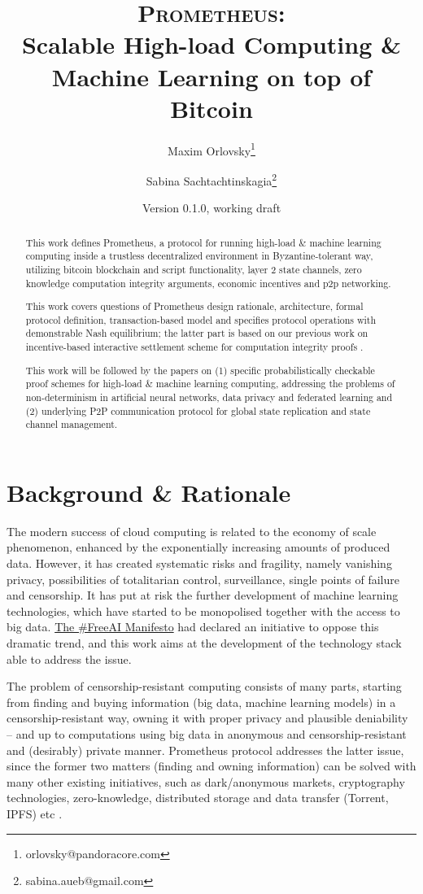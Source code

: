 \documentclass[a4paper]{article}
\title{\textsc{Prometheus}:\\Scalable High-load Computing \& Machine Learning on top of Bitcoin}
\author[1,2]{Maxim Orlovsky\thanks{orlovsky@pandoracore.com}}
\author[1,3]{Sabina Sachtachtinskagia\thanks{sabina.aueb@gmail.com}}
\affil[1]{Pandora Core AG, Switzerland}
\affil[2]{BICA Labs, Switzerland}
\affil[3]{Athens University of Economics and Business, Greece}
\date{Version 0.1.0, working draft}
\begin{document}
\maketitle

\begin{abstract}
This work defines Prometheus, a protocol for running high-load \& machine learning computing inside a trustless decentralized environment in Byzantine-tolerant way, utilizing bitcoin blockchain and script functionality, layer 2 state channels, zero knowledge computation integrity arguments, economic incentives and p2p networking.

This work covers questions of Prometheus design rationale, architecture, formal protocol  definition, transaction-based model and specifies protocol operations with demonstrable Nash equilibrium; the latter part is based on our previous work on incentive-based interactive settlement scheme for computation integrity proofs \cite{ibiss}.

This work will be followed by the papers on (1) specific probabilistically checkable proof schemes for high-load \& machine learning computing, addressing the problems of non-determinism in artificial neural networks, data privacy and federated learning and (2) underlying P2P communication protocol for global state replication and state channel management.
\end{abstract}


\section{Background \& Rationale}

The modern success of cloud computing is related to the economy of scale phenomenon, enhanced by the exponentially increasing amounts of produced data. However, it has created systematic risks and fragility, namely vanishing privacy, possibilities of totalitarian control, surveillance, single points of failure and censorship. It has put at risk the further development of machine learning technologies, which have started to be monopolised together with the access to big data. \href{https://manifesto.ai}{The \#FreeAI Manifesto} \cite{freeai} had declared an initiative to oppose this dramatic trend, and this work aims at the development of the technology stack able to address the issue.

The problem of censorship-resistant computing consists of many parts, starting from  finding and buying information (big data, machine learning models) in a censorship-resistant way, owning it with proper privacy and plausible deniability -- and up to computations using big data in anonymous and censorship-resistant and (desirably) private manner. Prometheus protocol addresses the latter issue, since the former two matters (finding and owning information) can be solved with many other existing initiatives, such as dark/anonymous markets, cryptography technologies, zero-knowledge, distributed storage and data transfer (Torrent, IPFS) etc \cite{ipfs, bittorrent, afs, tor, gnunet}. 
\end{document}

